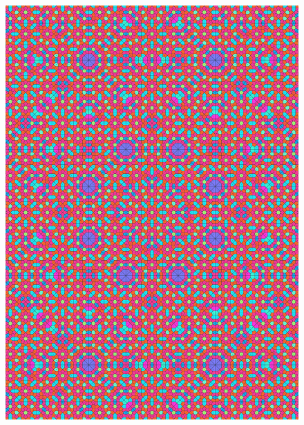 \documentclass[text.tex]{subfiles}
\begin{document}
\begin{figure}[h!]
\centering
\includegraphics[width=1\textwidth]{img/results/circle8/quasi_circle_126580_(1247_-516alpha_1).pdf}
\end{figure}
\end{document}
